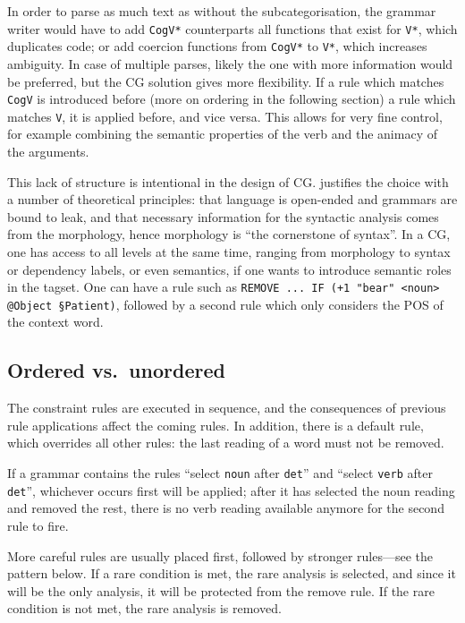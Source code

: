 In order to parse as much text as without the subcategorisation, the
grammar writer would have to add \texttt{CogV*} counterparts all
functions that exist for \texttt{V*}, which duplicates code; or add
coercion functions from  \texttt{CogV*} to \texttt{V*}, which increases ambiguity.
In case of multiple parses, likely the one with more information
would be preferred, but the CG solution gives more flexibility. If a
rule which matches \texttt{CogV} is introduced before (more on
ordering in the following section) a rule which matches \texttt{V}, it
is applied before, and vice versa. This allows for very fine control,
for example combining the semantic properties of the verb and the
animacy of the arguments.

This lack of structure is intentional in the design of CG.
\cite{karlsson1995constraint} justifies the choice with a number of
theoretical principles: that language is open-ended and grammars are
bound to leak, and that necessary information for the syntactic analysis
comes from the morphology, hence morphology is ``the cornerstone of
syntax''. In a CG, one has access to all levels at the same time,
ranging from morphology to syntax or dependency labels, or even
semantics, if one wants to introduce semantic roles in the
tagset. One can have a rule such as \texttt{REMOVE ... IF (+1 "bear" <noun>
  @Object §Patient)}, followed by a second rule which only considers the POS of the
context word.

\subsection*{Ordered vs.~unordered}\label{ordered-vs.unordered}

The constraint rules are executed in sequence, and the consequences of
previous rule applications affect the coming rules. In addition, there
is a default rule, which overrides all other rules: the last reading of
a word must not be removed.

If a grammar contains the rules ``select \texttt{noun} after
\texttt{det}'' and ``select \texttt{verb} after \texttt{det}'',
whichever occurs first will be applied; after it has selected the noun
reading and removed the rest, there is no verb reading available anymore
for the second rule to fire.

More careful rules are usually placed first, followed by stronger
rules---see the pattern below. If a rare condition is met, the rare
analysis is selected, and since it will be the only analysis, it will be
protected from the remove rule. If the rare condition is not met, the
rare analysis is removed.


